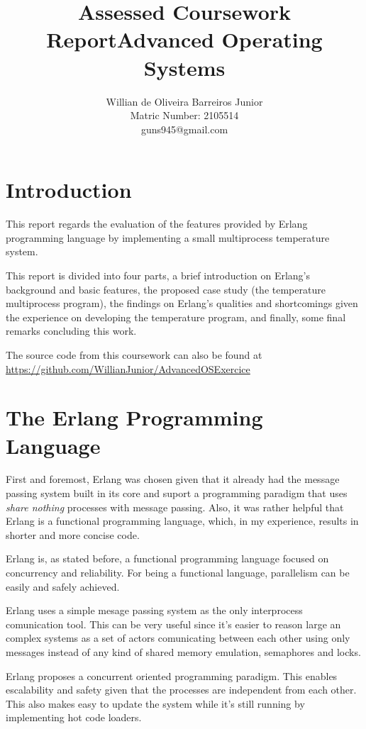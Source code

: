 \documentclass[twocolumn,10pt]{article}
\title{Assessed Coursework Report\linebreak Advanced Operating Systems}
\author{Willian de Oliveira Barreiros Junior\\
Matric Number: 2105514\\
 guns945@gmail.com\\}
\begin{document}
\clearpage
\thispagestyle{empty}
\maketitle

\section{Introduction}
This report regards the evaluation of the features provided by Erlang programming language by implementing a small multiprocess temperature system.

This report is divided into four parts, a brief introduction on Erlang's background and basic features, the proposed case  study (the temperature multiprocess program), the findings on Erlang's qualities and shortcomings given the experience on developing the temperature program, and finally, some final remarks concluding this work.

The source code from this coursework can also be found at
\url{https://github.com/WillianJunior/AdvancedOSExercice}

\section{The Erlang Programming Language}
First and foremost, Erlang was chosen given that it already had the message passing system built in its core and suport a programming paradigm that uses \textit{share nothing} processes with message passing. Also, it was rather helpful that Erlang is a functional programming language, which, in my experience, results in shorter and more concise code.

Erlang is, as stated before, a functional programming language focused on concurrency and reliability. For being a functional language, parallelism can be easily and safely achieved.

Erlang uses a simple mesage passing system as the only interprocess comunication tool. This can be very useful since it's easier to reason large an complex systems as a set of actors comunicating between each other using only messages instead of any kind of shared memory emulation, semaphores and locks.

Erlang proposes a concurrent oriented programming paradigm. This enables escalability and safety given that the processes are independent from each other. This also makes easy to update the system while it's still running by implementing hot code loaders.
\end{document}
